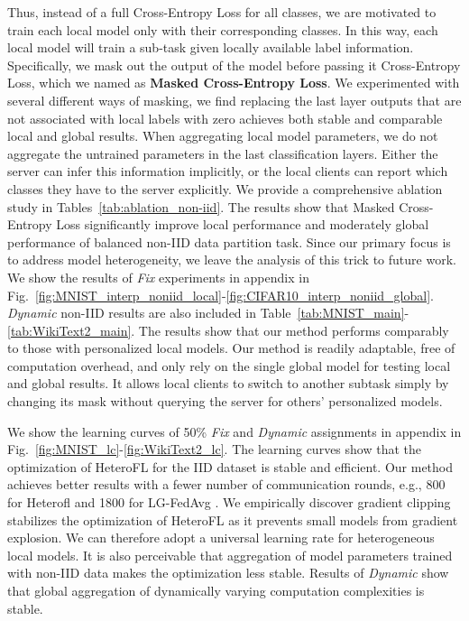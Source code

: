 \documentclass{article} %
\begin{document}
Thus, instead of a full Cross-Entropy Loss for all classes, we are motivated to train each local model only with their corresponding classes. In this way, each local model will train a sub-task given locally available label information. Specifically, we mask out the output of the model before passing it Cross-Entropy Loss, which we named as \textbf{Masked Cross-Entropy Loss}. We experimented with several different ways of masking, we find replacing the last layer outputs that are not associated with local labels with zero achieves both stable and comparable local and global results. When aggregating local model parameters, we do not aggregate the untrained parameters in the last classification layers. Either the server can infer this information implicitly, or the local clients can report which classes they have to the server explicitly.
We provide a comprehensive ablation study in Tables~\ref{tab:ablation_non-iid}. The results show that Masked Cross-Entropy Loss significantly improve local performance and moderately global performance of balanced non-IID data partition task.
Since our primary focus is to address model heterogeneity, we leave the analysis of this trick to future work. We show the results of \textit{Fix} experiments in appendix in Fig.~\ref{fig:MNIST_interp_noniid_local}-\ref{fig:CIFAR10_interp_noniid_global}. \textit{Dynamic} non-IID results are also included in Table~\ref{tab:MNIST_main}-\ref{tab:WikiText2_main}. The results show that our method performs comparably to those with personalized local models. Our method is readily adaptable, free of computation overhead, and only rely on the single global model for testing local and global results. It allows local clients to switch to another subtask simply by changing its mask without querying the server for others' personalized models. 

We show the learning curves of 50\% \textit{Fix} and \textit{Dynamic} assignments in appendix in Fig.~\ref{fig:MNIST_lc}-\ref{fig:WikiText2_lc}. The learning curves show that the optimization of HeteroFL for the IID dataset is stable and efficient. 
Our method achieves better results with a fewer number of communication rounds, e.g., 800 for Heterofl and 1800 for LG-FedAvg \citep{liang2020think}. 
We empirically discover gradient clipping stabilizes the optimization of HeteroFL as it prevents small models from gradient explosion. We can therefore adopt a universal learning rate for heterogeneous local models. It is also perceivable that aggregation of model parameters trained with non-IID data makes the optimization less stable. Results of \textit{Dynamic} show that global aggregation of dynamically varying computation complexities is stable. 
\end{document}
